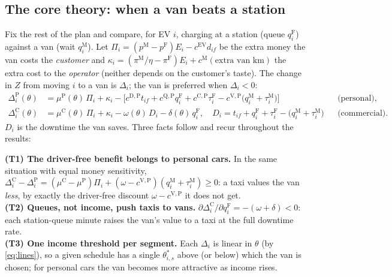 \subsection{The core theory: when a van beats a station}
\label{sec:theory}
Fix the rest of the plan and compare, for EV $i$, charging at a station (queue $q^{\mathrm F}_i$) against a van
(wait $q^{\mathrm M}_i$). Let $\Pi_i=(p^{\mathrm M}-p^{\mathrm F})E_i-c^{\mathrm{EV}}d_{if}$ be the extra money the
van costs the \emph{customer} and $\kappa_i=(\pi^{\mathrm M}/\eta-\pi^{\mathrm F})E_i+c^{\mathrm M}(\text{extra van km})$
the extra cost to the \emph{operator} (neither depends on the customer's taste). The change in $Z$ from moving $i$
to a van is $\Delta_i$; the van is preferred when $\Delta_i<0$:
\begin{align}
\Delta^{\mathrm P}_i(\theta)&=\mu^{\mathrm P}(\theta)\,\Pi_i+\kappa_i
-\Big[c^{\mathrm D,\mathrm P}t_{if}+c^{\mathrm Q,\mathrm P}q^{\mathrm F}_i+c^{\mathrm C,\mathrm P}\tau^{\mathrm F}_i
-c^{\mathrm V,\mathrm P}\big(q^{\mathrm M}_i+\tau^{\mathrm M}_i\big)\Big] &&\text{(personal)},\label{eq:delP}\\
\Delta^{\mathrm C}_i(\theta)&=\mu^{\mathrm C}(\theta)\,\Pi_i+\kappa_i-\omega(\theta)\,D_i-\delta(\theta)\,q^{\mathrm F}_i,
\quad D_i=t_{if}+q^{\mathrm F}_i+\tau^{\mathrm F}_i-\big(q^{\mathrm M}_i+\tau^{\mathrm M}_i\big) &&\text{(commercial)}.\label{eq:delC}
\end{align}
$D_i$ is the downtime the van saves. Three facts follow and recur throughout the results:

\begin{keybox}
\textbf{(T1) The driver-free benefit belongs to personal cars.} In the same situation with equal money
sensitivity, $\Delta^{\mathrm C}_i-\Delta^{\mathrm P}_i=(\mu^{\mathrm C}-\mu^{\mathrm P})\Pi_i
+(\omega-c^{\mathrm V,\mathrm P})(q^{\mathrm M}_i+\tau^{\mathrm M}_i)\ge0$: a taxi values the van \emph{less}, by
exactly the driver-free discount $\omega-c^{\mathrm V,\mathrm P}$ it does not get.\\[2pt]
\textbf{(T2) Queues, not income, push taxis to vans.} $\partial\Delta^{\mathrm C}_i/\partial q^{\mathrm F}_i
=-(\omega+\delta)<0$: each station-queue minute raises the van's value to a taxi at the full downtime rate.\\[2pt]
\textbf{(T3) One income threshold per segment.} Each $\Delta_i$ is linear in $\theta$ (by \eqref{eq:lines}), so a
given schedule has a single $\theta^{*}_{i,s}$ above (or below) which the van is chosen; for personal cars the
van becomes more attractive as income rises.
\end{keybox}

